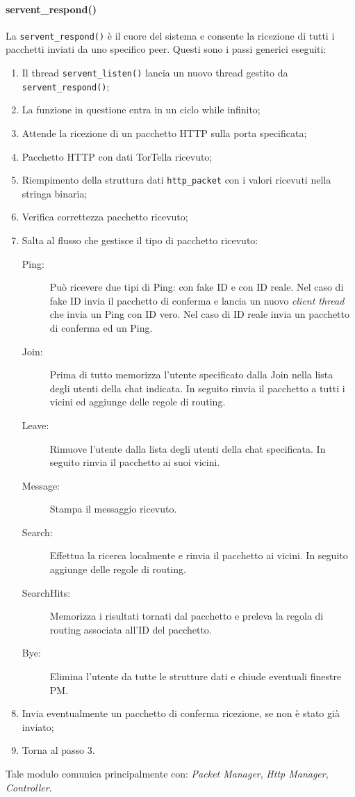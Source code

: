 \paragraph{servent\_respond()}
La \texttt{servent\_respond()} è il cuore del sistema e consente la ricezione di tutti i pacchetti inviati da uno specifico peer. Questi sono i passi generici eseguiti:
\begin{enumerate}
\item Il thread \texttt{servent\_listen()} lancia un nuovo thread gestito da \texttt{servent\_respond()};
\item La funzione in questione entra in un ciclo while infinito;
\item Attende la ricezione di un pacchetto HTTP sulla porta specificata;
\item Pacchetto HTTP con dati TorTella ricevuto;
\item Riempimento della struttura dati \texttt{http\_packet} con i valori ricevuti nella stringa binaria;
\item Verifica correttezza pacchetto ricevuto;
\item Salta al flusso che gestisce il tipo di pacchetto ricevuto:
\begin{description}
	\item[Ping:] Può ricevere due tipi di Ping: con fake ID e con ID reale. Nel caso di fake ID invia il pacchetto di conferma e lancia un nuovo \textit{client thread} che invia un Ping con ID vero. Nel caso di ID reale invia un pacchetto di conferma ed un Ping.
	\item[Join:] Prima di tutto memorizza l'utente specificato dalla Join nella lista degli utenti della chat indicata. In seguito rinvia il pacchetto a tutti i vicini ed aggiunge delle regole di routing.
	\item[Leave:] Rimuove l'utente dalla lista degli utenti della chat specificata. In seguito rinvia il pacchetto ai suoi vicini.
	\item[Message:] Stampa il messaggio ricevuto.
	\item[Search:] Effettua la ricerca localmente e rinvia il pacchetto ai vicini. In seguito aggiunge delle regole di routing.
	\item[SearchHits:] Memorizza i risultati tornati dal pacchetto e preleva la regola di routing associata all'ID del pacchetto.
	\item[Bye:] Elimina l'utente da tutte le strutture dati e chiude eventuali finestre PM.
\end{description}
\item Invia eventualmente un pacchetto di conferma ricezione, se non è stato già inviato;
\item Torna al passo 3.
\end{enumerate}
Tale modulo comunica principalmente con: \textit{Packet Manager}, \textit{Http Manager}, \textit{Controller}.
